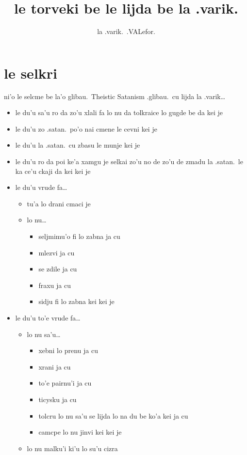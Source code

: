 \documentclass{article}
\title{le torveki be le lijda be la .varik.}
\author{la .varik.\ .VALefor.}
\begin{document}
\maketitle

\section{le selkri}

ni'o le selcme be la'o glibau.\ Theistic Satanism .glibau.\ cu lijda la .varik\ldots

\begin{itemize}
	\item le du'u sa'u ro da zo'u xlali fa lo nu da tolkraice lo gugde be da kei je
	\item le du'u zo .satan.\ po'o nai cmene le cevni kei je
	\item le du'u la .satan.\ cu zbasu le munje kei je
	\item le du'u ro da poi ke'a xamgu je selkai zo'u no de zo'u de zmadu la .satan.\ le ka ce'u ckaji da kei kei je
	\item le du'u vrude fa\ldots{}
	\begin{itemize}
		\item tu'a lo drani cmaci je
		\item lo nu\ldots{}
		\begin{itemize}
			\item seljmimu'o fi lo zabna ja cu
			\item mlezvi ja cu
			\item se zdile ja cu
			\item fraxu ja cu
			\item sidju fi lo zabna kei kei je
		\end{itemize}
	\end{itemize}
	\item le du'u to'e vrude fa\ldots{}
	\begin{itemize}
		\item lo nu sa'u\ldots{}
		\begin{itemize}
			\item xebni lo prenu ja cu
			\item xrani ja cu
			\item to'e pairnu'i ja cu
			\item ticysku ja cu
			\item tolcru lo nu sa'u se lijda lo na du be ko'a kei ja cu
			\item camcpe lo nu jinvi kei kei je
		\end{itemize}
		\item lo nu malku'i ki'u lo su'u cizra
	\end{itemize}
\end{itemize}
\end{document}
